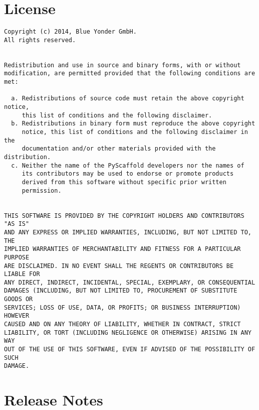 \documentclass[letterpaper,10pt,english]{sphinxmanual}
\begin{document}
\section{License}
\label{license::doc}\label{license:license}
\begin{Verbatim}[commandchars=\\\{\}]
Copyright (c) 2014, Blue Yonder GmbH.
All rights reserved.


Redistribution and use in source and binary forms, with or without
modification, are permitted provided that the following conditions are met:

  a. Redistributions of source code must retain the above copyright notice,
     this list of conditions and the following disclaimer.
  b. Redistributions in binary form must reproduce the above copyright
     notice, this list of conditions and the following disclaimer in the
     documentation and/or other materials provided with the distribution.
  c. Neither the name of the PyScaffold developers nor the names of
     its contributors may be used to endorse or promote products
     derived from this software without specific prior written
     permission.


THIS SOFTWARE IS PROVIDED BY THE COPYRIGHT HOLDERS AND CONTRIBUTORS "AS IS"
AND ANY EXPRESS OR IMPLIED WARRANTIES, INCLUDING, BUT NOT LIMITED TO, THE
IMPLIED WARRANTIES OF MERCHANTABILITY AND FITNESS FOR A PARTICULAR PURPOSE
ARE DISCLAIMED. IN NO EVENT SHALL THE REGENTS OR CONTRIBUTORS BE LIABLE FOR
ANY DIRECT, INDIRECT, INCIDENTAL, SPECIAL, EXEMPLARY, OR CONSEQUENTIAL
DAMAGES (INCLUDING, BUT NOT LIMITED TO, PROCUREMENT OF SUBSTITUTE GOODS OR
SERVICES; LOSS OF USE, DATA, OR PROFITS; OR BUSINESS INTERRUPTION) HOWEVER
CAUSED AND ON ANY THEORY OF LIABILITY, WHETHER IN CONTRACT, STRICT
LIABILITY, OR TORT (INCLUDING NEGLIGENCE OR OTHERWISE) ARISING IN ANY WAY
OUT OF THE USE OF THIS SOFTWARE, EVEN IF ADVISED OF THE POSSIBILITY OF SUCH
DAMAGE.
\end{Verbatim}


\section{Release Notes}
\label{changes:release-notes}\label{changes::doc}
\end{document}
